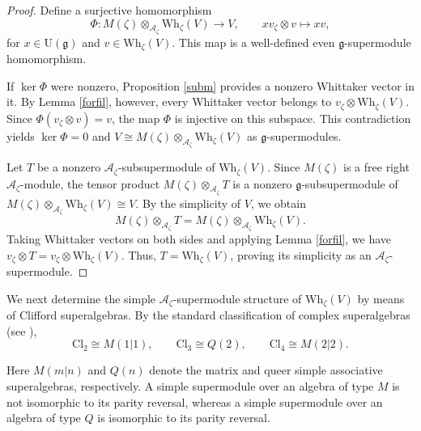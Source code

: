 \documentclass[a4paper,10pt]{article}
\theoremstyle{definition}
\theoremstyle{plain}
\theoremstyle{remark}
\theoremstyle{mystyle}
\numberwithin{equation}{section}
\begin{document}
\begin{proof}
    Define a surjective homomorphism
    $$
    \Phi:M(\zeta)\otimes_{\mathcal A_{\zeta}}\mathrm{Wh}_{\zeta}(V)\to V,\qquad xv_{\zeta}\otimes v\mapsto xv,
    $$
    for \(x\in \mathrm U(\mathfrak g)\) and \(v\in \mathrm{Wh}_{\zeta}(V)\). This map is a well-defined even $\mathfrak g$-supermodule homomorphism.
    
    If $\ker\Phi$ were nonzero, Proposition \ref{subm} provides a nonzero Whittaker vector in it. By Lemma \ref{forfil}, however, every Whittaker vector belongs to \(v_{\zeta}\otimes \mathrm{Wh}_{\zeta}(V)\). Since \(\Phi(v_{\zeta}\otimes v)=v\), the map \(\Phi\) is injective on this subspace.
    This contradiction yields $\ker\Phi=0$ and $V\cong M(\zeta)\otimes _{\mathcal A_{\zeta}}\mathrm{Wh}_{\zeta}(V)$ as $\mathfrak g$-supermodules. 
    
    Let \(T\) be a nonzero \(\mathcal A_\zeta\)-subsupermodule of \(\mathrm{Wh}_{\zeta}(V)\). Since \(M(\zeta)\) is a free right \(\mathcal A_\zeta\)-module, the tensor product
    \(
        M(\zeta)\otimes_{\mathcal A_\zeta}T
    \)
    is a nonzero \(\mathfrak g\)-subsupermodule of $
        M(\zeta)\otimes_{\mathcal A_\zeta}\mathrm{Wh}_{\zeta}(V)\cong V$. By the simplicity of \(V\), we obtain
    \[
    M(\zeta)\otimes_{\mathcal A_\zeta}T=M(\zeta)\otimes_{\mathcal A_\zeta}\mathrm{Wh}_{\zeta}(V).
    \]
    Taking Whittaker vectors on both sides and applying Lemma \ref{forfil}, we have $v_{\zeta}\otimes T=v_{\zeta}\otimes \mathrm{Wh}_{\zeta}(V)$. Thus, $T=\mathrm{Wh}_{\zeta}(V)$, proving its simplicity as an \(\mathcal A_\zeta\)-supermodule. 
\end{proof}
We next determine the simple $\mathcal A_{\zeta}$-supermodule structure of $\mathrm{Wh}_{\zeta}(V)$ by means of Clifford superalgebras. By the standard classification of complex superalgebras (see \cite[Section 3.1 and Exercise 3.11]{CW2012}),
\[
\mathrm{Cl}_2\cong M(1|1),\qquad
\mathrm{Cl}_3\cong Q(2),\qquad
\mathrm{Cl}_4\cong M(2|2).
\]

Here \(M(m|n)\) and \(Q(n)\) denote the matrix and queer simple associative superalgebras, respectively. A simple supermodule over an algebra of type \(M\) is not isomorphic to its parity reversal, whereas a simple supermodule over an algebra of type \(Q\) is isomorphic to its parity reversal.
\end{document}
